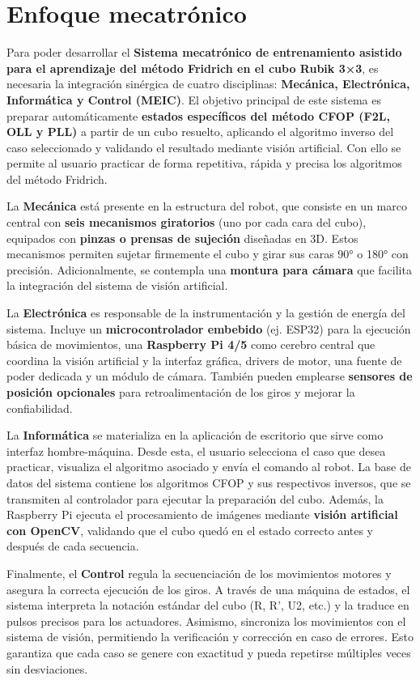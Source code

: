 \section{Enfoque mecatrónico}

Para poder desarrollar el \textbf{Sistema mecatrónico de entrenamiento asistido para el aprendizaje del método Fridrich en el cubo Rubik 3×3}, es necesaria la integración sinérgica de cuatro disciplinas: \textbf{Mecánica, Electrónica, Informática y Control (MEIC)}. El objetivo principal de este sistema es preparar automáticamente \textbf{estados específicos del método CFOP (F2L, OLL y PLL)} a partir de un cubo resuelto, aplicando el algoritmo inverso del caso seleccionado y validando el resultado mediante visión artificial. Con ello se permite al usuario practicar de forma repetitiva, rápida y precisa los algoritmos del método Fridrich.

La \textbf{Mecánica} está presente en la estructura del robot, que consiste en un marco central con \textbf{seis mecanismos giratorios} (uno por cada cara del cubo), equipados con \textbf{pinzas o prensas de sujeción} diseñadas en 3D. Estos mecanismos permiten sujetar firmemente el cubo y girar sus caras 90° o 180° con precisión. Adicionalmente, se contempla una \textbf{montura para cámara} que facilita la integración del sistema de visión artificial.

La \textbf{Electrónica} es responsable de la instrumentación y la gestión de energía del sistema. Incluye un \textbf{microcontrolador embebido} (ej. ESP32) para la ejecución básica de movimientos, una \textbf{Raspberry Pi 4/5} como cerebro central que coordina la visión artificial y la interfaz gráfica, drivers de motor, una fuente de poder dedicada y un módulo de cámara. También pueden emplearse \textbf{sensores de posición opcionales} para retroalimentación de los giros y mejorar la confiabilidad.

La \textbf{Informática} se materializa en la aplicación de escritorio que sirve como interfaz hombre-máquina. Desde esta, el usuario selecciona el caso que desea practicar, visualiza el algoritmo asociado y envía el comando al robot. La base de datos del sistema contiene los algoritmos CFOP y sus respectivos inversos, que se transmiten al controlador para ejecutar la preparación del cubo. Además, la Raspberry Pi ejecuta el procesamiento de imágenes mediante \textbf{visión artificial con OpenCV}, validando que el cubo quedó en el estado correcto antes y después de cada secuencia.

Finalmente, el \textbf{Control} regula la secuenciación de los movimientos motores y asegura la correcta ejecución de los giros. A través de una máquina de estados, el sistema interpreta la notación estándar del cubo (R, R', U2, etc.) y la traduce en pulsos precisos para los actuadores. Asimismo, sincroniza los movimientos con el sistema de visión, permitiendo la verificación y corrección en caso de errores. Esto garantiza que cada caso se genere con exactitud y pueda repetirse múltiples veces sin desviaciones.

